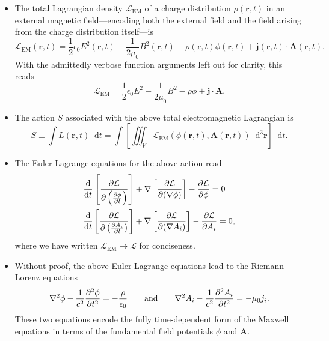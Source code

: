 \documentclass[11pt, a4paper]{article}
\newcommand{\diff}{\mathop{}\!\mathrm{d}} %
\newcommand{\dr}{\diff^{3} \r}  %
\newcommand{\eqtext}[1]{\qquad \text{#1} \qquad}
\renewcommand{\L}{\mathcal{L}}  %
\renewcommand{\vec}[1]{\bm{#1}} %
\renewcommand{\r}{\vec{r}}
\newcommand{\A}{\vec{A}} %
\newcommand{\ee}{\epsilon_{0}}  %
\newcommand{\mm}{\mu_{0}}  %
\renewcommand{\j}{\vec{j}}  %
\renewcommand{\grad}{\nabla}
\renewcommand{\laplacian}{\nabla^{2}}
\begin{document}
\begin{itemize}

    \item The total Lagrangian density $ \L_{\text{EM}} $ of a charge distribution $ \rho(\r, t) $ in an external magnetic field---encoding both the external field and the field arising from the charge distribution itself---is
	\begin{equation*}
		\L_{\text{EM}}(\r, t) = \frac{1}{2}\ee E^{2}(\r, t) - \frac{1}{2\mm}B^{2}(\r, t) - \rho(\r, t)\phi(\r, t) + \j(\r, t) \cdot \A(\r, t).
	\end{equation*}
    With the admittedly verbose function arguments left out for clarity, this reads
    \begin{equation*}
        \L_{\text{EM}} = \frac{1}{2}\ee E^{2} - \frac{1}{2 \mm}B^{2} - \rho\phi + \j \cdot \A.
    \end{equation*}
    
    

	\item The action $ S $ associated with the above total electromagnetic Lagrangian is 
	\begin{equation*}
        S \equiv \int L(\r, t) \diff t = \int \left[ \iiint_{V} \L_{\text{EM}}(\phi(\r, t), \A(\r, t))\dr \right] \diff t.
	\end{equation*}
	
    \item The Euler-Lagrange equations for the above action read
	\begin{align*}
		&\dv{t}\left[\pdv{\L}{\left(\pdv{\phi}{t}\right)}\right] + \grad \left[\pdv{\L}{(\grad \phi)}\right] - \pdv{\L}{\phi} = 0\\
		& \dv{t} \left[\pdv{\L}{\left(\pdv{A_{i}}{t}\right)}\right] + \grad \left[\pdv{\L}{(\grad A_{i})}\right] - \pdv{\L}{A_{i}} = 0,
	\end{align*}
    where we have written $ \L_{\text{EM}} \to \L $ for conciseness. 
	
	\item Without proof, the above Euler-Lagrange equations lead to the Riemann-Lorenz equations
	\begin{align*}
		\laplacian \phi - \frac{1}{c^{2}}\pdv[2]{\phi}{t} = -\frac{\rho}{\ee} \eqtext{and} \laplacian A_{i} - \frac{1}{c^{2}} \pdv[2]{A_{i}}{t} = - \mm j_{i}.
	\end{align*}
	These two equations encode the fully time-dependent form of the Maxwell equations in terms of the fundamental field potentials $ \phi $ and $ \A $.
	

\end{itemize}
\end{document}
